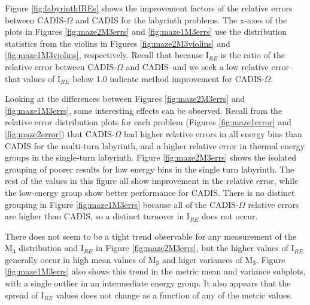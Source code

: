 Figure \ref{fig:labyrinthIREs} shows the improvement factors of the relative
errors between CADIS-$\Omega$ and CADIS for the labyrinth problems. The x-axes
of the plots in Figures \ref{fig:maze2M3errs} and \ref{fig:maze1M3errs} use the
distribution statistics from the violins in Figures \ref{fig:maze2M3violins} and
\ref{fig:maze1M3violins}, respectively. Recall that because I$_{RE}$ is the
ratio of the relative error between CADIS-$\Omega$ and CADIS--and we seek a low
relative error--that values of I$_{RE}$ below 1.0 indicate method improvement
for CADIS-$\Omega$.

Looking at the differences between Figures \ref{fig:maze2M3errs} and
\ref{fig:maze1M3errs}, some interesting effects can be observed. Recall from the
relative error distribution plots for each problem (Figures \ref{fig:maze1error} and
\ref{fig:maze2error}) that CADIS-$\Omega$ had higher relative errors in all
energy bins than CADIS for the multi-turn labyrinth, and a higher relative
error in thermal energy groups in the single-turn labyrinth.
Figure
\ref{fig:maze2M3errs} shows the isolated grouping of poorer results for low
energy bins in the single turn labyrinth. The rest of the values in this figure
all show improvement in the relative error, while the low-energy group show
better performance for CADIS. There is no distinct grouping in Figure
\ref{fig:maze1M3errs} because all of the CADIS-$\Omega$ relative errors are
higher than CADIS, so a distinct turnover in I$_{RE}$ does not occur.

There does not seem to be a tight
trend
observable for any measurement of the M$_3$ distribution and I$_{RE}$ in Figure
\ref{fig:maze2M3errs}, but the higher values of I$_{RE}$ generally occur in high
mean values of M$_3$ and higer variances of M$_3$. Figure \ref{fig:maze1M3errs}
also shows this trend in the metric mean and variance subplots, with a single
outlier in an intermediate energy group. It also appears that the spread of
I$_{RE}$ values does not change as a function of any of the metric values.

